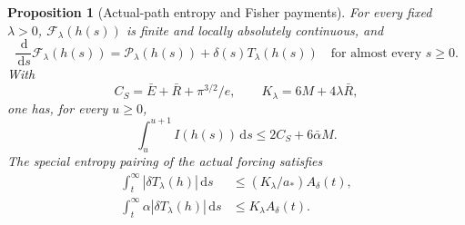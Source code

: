 \documentclass[11pt]{article}
\numberwithin{equation}{section}
\newtheorem{proposition}[theorem]{Proposition}
\newcommand{\dd}{\,\mathrm d}
\begin{document}
\begin{proposition}[Actual-path entropy and Fisher payments]
\label{r14:entropypayment}
For every fixed $\lambda>0$, $\mathcal F_\lambda(h(s))$ is finite
and locally absolutely continuous, and
\begin{equation}\label{r14:actualentropy}
 \frac{\dd}{\dd s}\mathcal F_\lambda(h(s))
 =\mathcal P_\lambda(h(s))+\delta(s)T_\lambda(h(s))
 \quad\text{for almost every }s\ge0.
\end{equation}
With
\[
 C_S=\bar E+\bar R+\pi^{3/2}/e,\qquad
 K_\lambda=6M+4\lambda\bar R,
\]
one has, for every $u\ge0$,
\begin{equation}\label{r14:fisherwindow}
 \int_u^{u+1}I(h(s))\dd s\le2C_S+6\bar\alpha M.
\end{equation}
The special entropy pairing of the actual forcing satisfies
\begin{align}
 \int_t^\infty|\delta T_\lambda(h)|\dd s
 &\le (K_\lambda/a_*)A_\delta(t),\nonumber\\
 \int_t^\infty\alpha|\delta T_\lambda(h)|\dd s
 &\le K_\lambda A_\delta(t).
 \label{r14:entropyforcing}
\end{align}
\end{proposition}
\end{document}

